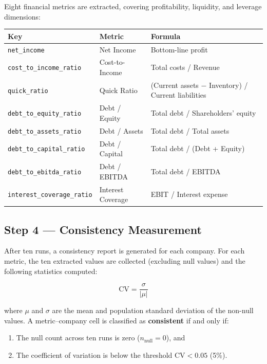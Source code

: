 \documentclass[12pt, a4paper]{article}
\begin{document}
Eight financial metrics are extracted, covering profitability, liquidity, and
leverage dimensions:

\begin{center}
\begin{tabular}{lll}
\toprule
\textbf{Key} & \textbf{Metric} & \textbf{Formula} \\
\midrule
\texttt{net\_income}             & Net Income             & Bottom-line profit \\
\texttt{cost\_to\_income\_ratio} & Cost-to-Income         & Total costs / Revenue \\
\texttt{quick\_ratio}            & Quick Ratio            & (Current assets $-$ Inventory) / Current liabilities \\
\texttt{debt\_to\_equity\_ratio} & Debt / Equity          & Total debt / Shareholders' equity \\
\texttt{debt\_to\_assets\_ratio} & Debt / Assets          & Total debt / Total assets \\
\texttt{debt\_to\_capital\_ratio}& Debt / Capital         & Total debt / (Debt + Equity) \\
\texttt{debt\_to\_ebitda\_ratio} & Debt / EBITDA          & Total debt / EBITDA \\
\texttt{interest\_coverage\_ratio}& Interest Coverage     & EBIT / Interest expense \\
\bottomrule
\end{tabular}
\end{center}

\subsection{Step 4 — Consistency Measurement}
\label{sec:consistency-measure}

After ten runs, a consistency report is generated for each company.  For each
metric, the ten extracted values are collected (excluding null values) and the
following statistics computed:

\begin{equation}
  \text{CV} = \frac{\sigma}{\lvert\mu\rvert}
\end{equation}

where $\mu$ and $\sigma$ are the mean and population standard deviation of the
non-null values.  A metric--company cell is classified as \textbf{consistent}
if and only if:

\begin{enumerate}[noitemsep]
  \item The null count across ten runs is zero ($n_{\text{null}} = 0$), and
  \item The coefficient of variation is below the threshold
        $\text{CV} < 0.05$ (5\%).
\end{enumerate}
\end{document}

